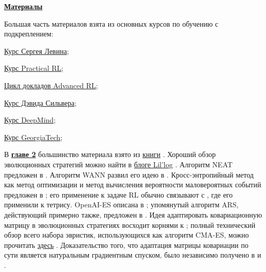 \newcommand*{\sectionsources}[1]{\textbf{\textcolor{ChadBlue}{\underline{#1}}}}   %

\newpage
\begin{center}
\huge \textbf{\textcolor{ChadBlue}{\underline{Материалы}}}

\normalsize
\vspace{0.3cm}
Большая часть материалов взята из основных курсов по обучению с подкреплением:

\vspace{0.3cm}
\href{https://www.youtube.com/playlist?list=PL_iWQOsE6TfURIIhCrlt-wj9ByIVpbfGc}{Курс Сергея Левина}; %

\vspace{0.3cm}
\href{https://github.com/yandexdataschool/Practical_RL}{Курс Practical RL};

\vspace{0.3cm}
\href{https://deeppavlov.ai/rl_course_2020}{Цикл докладов Advanced RL};

\vspace{0.3cm}
\href{https://www.davidsilver.uk/teaching/}{Курс Дэвида Сильвера};

\vspace{0.3cm}
\href{https://www.youtube.com/watch?v=ISk80iLhdfU&list=PLqYmG7hTraZBKeNJ-JE_eyJHZ7XgBoAyb&index=1}{Курс DeepMind};

\vspace{0.3cm}
\href{https://www.udacity.com/course/reinforcement-learning--ud600}{Курс GeorgiaTech};
\end{center}

В \underline{\textbf{главе 2}} большинство материала взято из \href{https://cs.gmu.edu/~sean/book/metaheuristics/Essentials.pdf}{книги} \cite{luke2013essentials}. Хороший обзор эволюционных стратегий можно найти в \href{https://lilianweng.github.io/lil-log/2019/09/05/evolution-strategies.html}{блоге Lil'log} \cite{weng2019ES}. Алгоритм NEAT предложен в \cite{stanley2002evolving}. Алгоритм WANN развил его идею в \cite{gaier2019weight}. Кросс-энтропийный метод как метод оптимизации и метод вычисления вероятности маловероятных событий предложен в \cite{botev2013cross}; его применение к задаче RL обычно связывают с \cite{szita2006learning}, где его применили к тетрису. OpenAI-ES описана в \cite{salimans2017evolution}; упомянутый алгоритм ARS, действующий примерно также, предложен в \cite{mania2018simple}. Идея адаптировать ковариационную матрицу в эволюционных стратегиях восходит корнями к \cite{hansen1996adapting}; полный технический обзор всего набора эвристик, использующихся как алгоритм CMA-ES, можно прочитать \href{https://arxiv.org/pdf/1604.00772.pdf}{здесь} \cite{hansen2016cma}. Доказательство того, что адаптация матрицы ковариации по сути является натуральным градиентным спуском, было независимо получено в \cite{akimoto2010bidirectional} и \cite{glasmachers2010exponential}.

